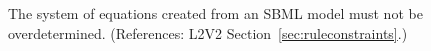 The system of equations created from an SBML model must not be
overdetermined.  (References: L2V2
Section~\ref{sec:ruleconstraints}.)
